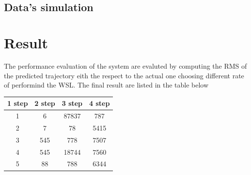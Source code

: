 \documentclass[twocolumn]{article}
\begin{document}
    \subsection*{Data's simulation}

    \section*{Result}
    The performance evaluation of the system are evaluted by computing the RMS of the predicted trajectory eith the respect to the actual one
    choosing different rate of performind the WSL. The final result are listed in the table below


    \begin{center}
        \begin{tabular}{||c c c c||}
            \hline
            1 step & 2 step & 3 step & 4 step \\ [0.5ex]
            \hline\hline
            1      & 6      & 87837  & 787    \\
            \hline
            2      & 7      & 78     & 5415   \\
            \hline
            3      & 545    & 778    & 7507   \\
            \hline
            4      & 545    & 18744  & 7560   \\
            \hline
            5      & 88     & 788    & 6344   \\ [1ex]
            \hline
        \end{tabular}
    \end{center}


    \subsection*{}
\end{document}
